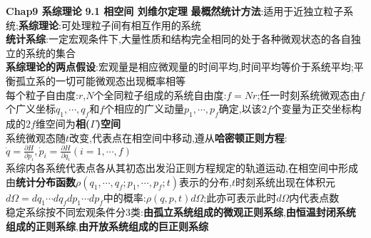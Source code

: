 \documentclass[10pt,a4paper]{article}
\begin{document}
\begin{multicols}{2}
\noindent\textbf{Chap9 系综理论}
\textbf{9.1 相空间 刘维尔定理}
\textbf{最概然统计方法}:适用于近独立粒子系统;\textbf{系综理论}:可处理粒子间有相互作用的系统\\
\textbf{统计系综}:一定宏观条件下,大量性质和结构完全相同的处于各种微观状态的各自独立的系统的集合\\
\textbf{系综理论的两点假设}:宏观量是相应微观量的时间平均,时间平均等价于系统平均;平衡孤立系的一切可能微观态出现概率相等\\
每个粒子自由度:$r$,$N$个全同粒子组成的系统自由度:$f=Nr$;任一时刻系统微观态由$f$个广义坐标$q_1,\cdots,q_f$和$f$个相应的广义动量$p_1,\cdots,p_f$确定,以该$2f$个变量为正交坐标构成的$2f$维空间为\textbf{相($\Gamma$)空间}\\
系统微观态随$t$改变,代表点在相空间中移动,遵从\textbf{哈密顿正则方程}:$\dot{q}=\frac{\partial H}{\partial p_i},\dot{p}_i=\frac{\partial H}{\partial q_i}(i=1,\cdots,f)$\\
系综内各系统代表点各从其初态出发沿正则方程规定的轨道运动,在相空间中形成由\textbf{统计分布函数}$\rho(q_1,\cdots,q_f;p_1,\cdots,p_f;t)$表示的分布,$t$时刻系统出现在体积元$d\Omega=dq_1\cdots dq_fdp_1\cdots dp_f$中的概率:$\rho(q,p,t)d\Omega$;此亦可表示此时$d\Omega$内代表点数\\
稳定系综按不同宏观条件分$3$类:\textbf{由孤立系统组成的微观正则系综},\textbf{由恒温封闭系统组成的正则系综},\textbf{由开放系统组成的巨正则系综}\\

\end{multicols}
\end{document}
